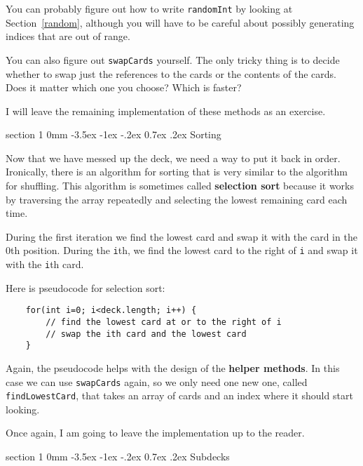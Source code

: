 \documentclass{book}
\makeatletter
\renewcommand{\section}{\@startsection 
    {section} {1} {0mm}%
    {-3.5ex \@plus -1ex \@minus -.2ex}%
    {0.7ex \@plus.2ex}%
    {\normalfont\Large\bfseries}}
\makeatother
\begin{document}

You can probably figure out how to write {\tt randomInt}
by looking at Section~\ref{random}, although you will have to
be careful about possibly generating indices that are out of range.


You can also figure out {\tt swapCards} yourself.  The only
tricky thing is to decide whether to swap just the references
to the cards or the contents of the cards.  Does it matter
which one you choose?  Which is faster?

I will leave the remaining implementation of these methods
as an exercise.


\section{Sorting}
\label{sorting}

Now that we have messed up the deck, we need a way to put it
back in order.  Ironically, there is an algorithm for
sorting that is very similar to the algorithm for shuffling.
This algorithm is sometimes called {\bf selection sort}
because it works by traversing the array repeatedly and 
selecting the lowest remaining card each time.


During the first iteration we find the lowest card and swap
it with the card in the 0th position.  During the {\tt i}th, we find the
lowest card to the right of {\tt i} and swap it with the {\tt i}th
card.

Here is pseudocode for selection sort:

\begin{verbatim}
    for(int i=0; i<deck.length; i++) {
        // find the lowest card at or to the right of i
        // swap the ith card and the lowest card
    }
\end{verbatim}
%
Again, the pseudocode helps with the design of the {\bf helper
methods}.  In this case we can use {\tt swapCards} again,
so we only need one new one, called {\tt findLowestCard},
that takes an array of cards and an index where it should
start looking.


Once again, I am going to leave the implementation up to
the reader.


\section {Subdecks}
\end{document}
